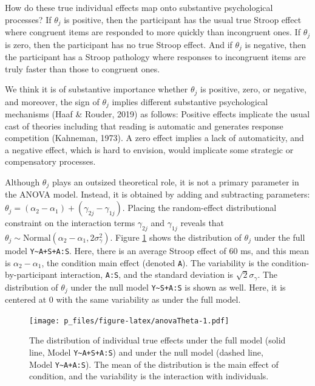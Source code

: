 \documentclass[
  english,
  ,man]{apa6}
\begin{document}
How do these true individual effects map onto substantive psychological processes? If \(\theta_j\) is positive, then the participant has the usual true Stroop effect where congruent items are responded to more quickly than incongruent ones. If \(\theta_j\) is zero, then the participant has no true Stroop effect. And if \(\theta_j\) is negative, then the participant has a Stroop pathology where responses to incongruent items are truly faster than those to congruent ones.

We think it is of substantive importance whether \(\theta_j\) is positive, zero, or negative, and moreover, the sign of \(\theta_j\) implies different substantive psychological mechanisms (Haaf \& Rouder, 2019) as follows: Positive effects implicate the usual cast of theories including that reading is automatic and generates response competition (Kahneman, 1973). A zero effect implies a lack of automaticity, and a negative effect, which is hard to envision, would implicate some strategic or compensatory processes.

Although \(\theta_j\) plays an outsized theoretical role, it is not a primary parameter in the ANOVA model. Instead, it is obtained by adding and subtracting parameters: \(\theta_j=(\alpha_2-\alpha_1)+(\gamma_{2j}-\gamma_{1j})\). Placing the random-effect distributional constraint on the interaction terms \(\gamma_{2j}\) and \(\gamma_{1j}\) reveals that
\(\theta_j \sim \mbox{Normal}(\alpha_2-\alpha_1,2\sigma^2_\gamma)\). Figure \ref{fig:anovaTheta} shows the distribution of \(\theta_j\) under the full model \texttt{Y\textasciitilde{}A+S+A:S}. Here, there is an average Stroop effect of 60 ms, and this mean is \(\alpha_2-\alpha_1\), the condition main effect (denoted \texttt{A}). The variability is the condition-by-participant interaction, \texttt{A:S}, and the standard deviation is \(\sqrt{2}\sigma_\gamma\). The distribution of \(\theta_j\) under the null model \texttt{Y\textasciitilde{}S+A:S} is shown as well. Here, it is centered at 0 with the same variability as under the full model.

\begin{figure}
\centering
\texttt{[image: p\_files/figure-latex/anovaTheta-1.pdf]}
\caption{\label{fig:anovaTheta}The distribution of individual true effects under the full model (solid line, Model \texttt{Y\textasciitilde{}A+S+A:S}) and under the null model (dashed line, Model \texttt{Y\textasciitilde{}A+A:S}). The mean of the distribution is the main effect of condition, and the variability is the interaction with individuals.}
\end{figure}
\end{document}
